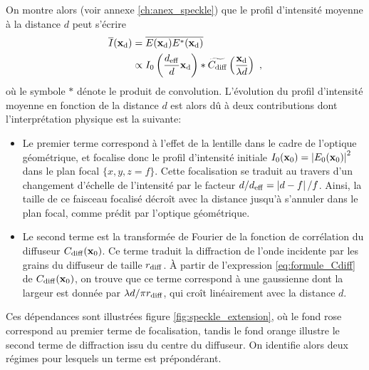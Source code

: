 On montre alors (voir annexe \ref{ch:anex_speckle}) que le profil d'intensité moyenne à la distance $d$ peut s'écrire \citep{gatti2008three}
\begin{align}
\nonumber\overline{I}(\mathbf{x}_{\mathrm{d}})&=\overline{E(\mathbf{x}_{\mathrm{d}}) E^*(\mathbf{x}_{\mathrm{d}})} \\
&\propto I_0 \left( \frac{d_{\mathrm{eff}}}{d} \mathbf{x}_{\mathrm{d}} \right) \ast \widetilde{C_{\mathrm{diff}}}\left( \frac{\mathbf{x}_{\mathrm{d}}}{\lambda d} \right) \text{ ,}
\label{eq:evolution_extension_transverse_speckle}
\end{align}
où le symbole $\ast$ dénote le produit de convolution. L'évolution du profil d'intensité moyenne en fonction de la distance $d$ est alors dû à deux contributions dont l'interprétation physique est la suivante:
\begin{itemize}
\item[\textendash] Le premier terme correspond à l'effet de la lentille dans le cadre de l'optique géométrique, et focalise donc le profil d'intensité initiale $I_0(\mathbf{x}_0)=\left| E_0(\mathbf{x}_0) \right|^2$ dans le plan focal $\lbrace x,y,z=f\rbrace$. Cette focalisation se traduit au travers d'un changement d'échelle de l'intensité par le facteur $d/d_{\mathrm{eff}}=\left| d-f \right| /f$. Ainsi, la taille de ce faisceau focalisé décroît avec la distance jusqu'à s'annuler dans le plan focal, comme prédit par l'optique géométrique.
\item[\textendash] Le second terme est la transformée de Fourier de la fonction de corrélation du diffuseur $C_{\mathrm{diff}}(\mathbf{x}_0)$. Ce terme traduit la diffraction de l'onde incidente par les grains du diffuseur de taille $r_{\mathrm{diff}}$. À partir de l'expression \ref{eq:formule_Cdiff} de $C_{\mathrm{diff}}(\mathbf{x}_0)$, on trouve que ce terme correspond à une gaussienne dont la largeur est donnée par $\lambda d/ \pi r_{\mathrm{diff}}$, qui croît linéairement avec la distance $d$.
\end{itemize}
Ces dépendances sont illustrées figure \ref{fig:speckle_extension}, où le fond rose correspond au premier terme de focalisation, tandis le fond orange illustre le second terme de diffraction issu du centre du diffuseur. On identifie alors deux régimes pour lesquels un terme est prépondérant. 

